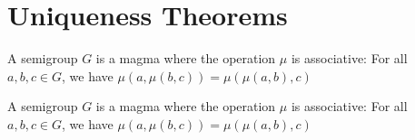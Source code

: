 \section{Uniqueness Theorems}

\begin{theorem}
    \label{theorem : identity_uniqueness}
    \leanok
    A semigroup $G$ is a magma where the operation $\mu$ is associative:
    For all $a, b, c \in G$, we have $\mu(a , \mu (b , c)) = \mu(\mu(a, b), c)$
  \end{theorem}

\begin{theorem}
    \label{theorem : inverse_uniqueness}
    \leanok
    A semigroup $G$ is a magma where the operation $\mu$ is associative:
    For all $a, b, c \in G$, we have $\mu(a , \mu (b , c)) = \mu(\mu(a, b), c)$
  \end{theorem}
